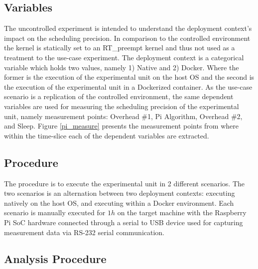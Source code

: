 \subsection{Variables}

The uncontrolled experiment is intended to understand the deployment context's impact on the scheduling precision. In comparison to the controlled environment the kernel is statically set to an RT\_preempt kernel and thus not used as a treatment to the use-case experiment. The deployment context is a categorical variable which holds two values, namely 1) Native and 2) Docker. Where the former is the execution of the experimental unit on the host OS and the second is the execution of the experimental unit in a Dockerized container. As the use-case scenario is a replication of the controlled environment, the same dependent variables are used for measuring the scheduling precision of the experimental unit, namely measurement points:  Overhead \#1,  Pi Algorithm,  Overhead \#2, and Sleep. Figure \ref{pi_measure} presents the measurement points from where within the time-slice each of the dependent variables are extracted.\\


\subsection{Procedure}

The procedure is to execute the experimental unit in 2 different scenarios. The two scenarios is an alternation between two deployment contexts: executing natively on the host OS, and executing within a Docker environment. Each scenario is manually executed for $1h$ on the target machine with the Raspberry Pi SoC \cite{raspberry} hardware connected through a serial to USB device used for capturing measurement data via RS-232 serial communication.\\


\subsection{Analysis Procedure}

